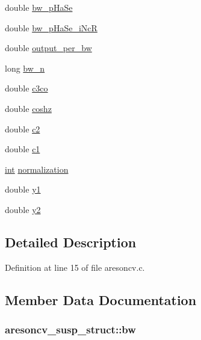 \begin{DoxyCompactItemize}
\item 
double \hyperlink{structaresoncv__susp__struct_aeea5b2e37e18ddc8f967325ca33c3064}{bw\+\_\+p\+Ha\+Se}
\item 
double \hyperlink{structaresoncv__susp__struct_a9eb6fd72fe06b456e5c86068526b54f1}{bw\+\_\+p\+Ha\+Se\+\_\+i\+NcR}
\item 
double \hyperlink{structaresoncv__susp__struct_a3a033046459c77cd41fc130423e1e1e6}{output\+\_\+per\+\_\+bw}
\item 
long \hyperlink{structaresoncv__susp__struct_a91496ab2df06e905d88abcdc46597906}{bw\+\_\+n}
\item 
double \hyperlink{structaresoncv__susp__struct_a1f6cab8068a5f3606f43527609bae8d3}{c3co}
\item 
double \hyperlink{structaresoncv__susp__struct_a6e7c9a2e06d615f418f38152ec5513b6}{coshz}
\item 
double \hyperlink{structaresoncv__susp__struct_af399025e19a9d148152c5681b21ab4d9}{c2}
\item 
double \hyperlink{structaresoncv__susp__struct_a4f02d6ecaef6b0c5ea0a303c1f123865}{c1}
\item 
\hyperlink{xmltok_8h_a5a0d4a5641ce434f1d23533f2b2e6653}{int} \hyperlink{structaresoncv__susp__struct_a3e361b18c427aa0c3c16360cc5f629be}{normalization}
\item 
double \hyperlink{structaresoncv__susp__struct_a21f968973e8d736ca28ab4b8b9a4002b}{y1}
\item 
double \hyperlink{structaresoncv__susp__struct_a02260f5e9f43df63d9ea52f3f254a0c2}{y2}
\end{DoxyCompactItemize}


\subsection{Detailed Description}


Definition at line 15 of file aresoncv.\+c.



\subsection{Member Data Documentation}
\subsubsection[{\texorpdfstring{bw}{bw}}]{ aresoncv\+\_\+susp\+\_\+struct\+::bw}\hypertarget{structaresoncv__susp__struct_af742db5268eab56487c47e17d25eb479}{}\label{structaresoncv__susp__struct_af742db5268eab56487c47e17d25eb479}


